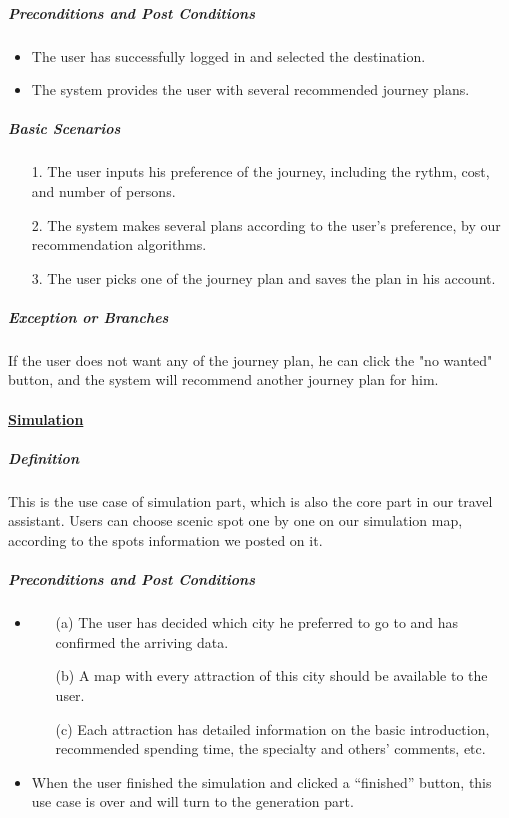 \documentclass[10pt]{article}
\begin{document}
\begin{itemize}
		\subparagraph{Preconditions and Post Conditions}
		\begin{itemize}
			\item The user has successfully logged in and selected the destination.
			\item The system provides the user with several recommended journey plans.
		\end{itemize}

		\subparagraph{Basic Scenarios}
		\begin{itemize}
			\item[1.] The user inputs his preference of the journey, including the rythm, cost, and number of persons.
			\item[2.]The system makes several plans according to the user's preference, by our recommendation algorithms.
			\item[3.]The user picks one of the journey plan and saves the plan in his account.
		
		\end{itemize}

		\subparagraph{Exception or Branches}
		If the user does not want any of the journey plan, he can click the "no wanted" button, and the system will recommend another journey plan for him.

		\paragraph{\underline{Simulation}}
		\subparagraph{Definition}
		This is the use case of simulation part, which is also the core part in our travel assistant. Users can choose scenic spot one by one on our simulation map, according to the spots information we posted on it.

		\subparagraph{Preconditions and Post Conditions}
		\begin{itemize}
			\item \begin{itemize}
				\item[(a)] The user has decided which city he preferred to go to and has confirmed the arriving data.
				\item[(b)] A map with every attraction of this city should be available to the user.
				\item[(c)] Each attraction has detailed information on the basic introduction, recommended spending time, the specialty and others’ comments, etc. 
			\end{itemize}
			\item When the user finished the simulation and clicked a “finished” button, this use case is over and will turn to the generation part.
		\end{itemize}


\end{itemize}
\end{document}
